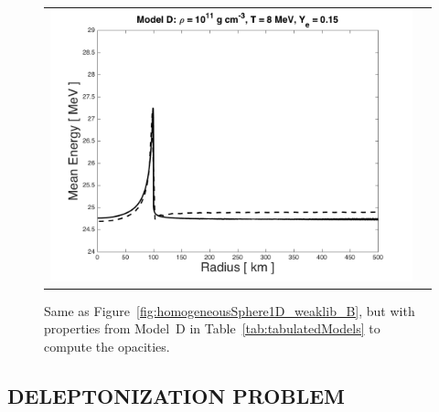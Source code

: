 \documentclass[11pt,letterpaper,twoside,english,final]{article}
\begin{document}
\begin{figure}[h]
\begin{tabular}{cc}
    \includegraphics[scale=0.4]{./Figures/HomogeneousSphereTable_D_MeanEnergy}
  \end{tabular}
  \vspace{-0.1in}
  \caption{Same as Figure~\ref{fig:homogeneousSphere1D_weaklib_B}, but with properties from Model~D in Table~\ref{tab:tabulatedModels} to compute the opacities.}
  \label{fig:homogeneousSphere1D_weaklib_D}
\end{figure}

\subsection{DELEPTONIZATION PROBLEM}
\label{sec:deleptonizationProblem}
\end{document}

